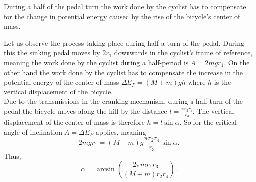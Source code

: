 {\ifEngHint
During a half of the pedal turn the work done by the cyclist has to compensate for the change in potential energy caused by the rise of the bicycle’s center of mass.
\fi


\ifEngSolution
Let us observe the process taking place during half a turn of the pedal. During this the sinking pedal moves by $2r_1$ downwards in the cyclist’s frame of reference, meaning the work done by the cyclist during a half-period is $A = 2mgr_1$. On the other hand the work done by the cyclist has to compensate the increase in the potential energy of the center of mass $\Delta E_P = (M + m)gh$ where $h$ is the vertical displacement of the bicycle.\\
Due to the transmissions in the cranking mechanism, during a half turn of the pedal the bicycle moves along the hill by the distance $l=\frac{\pi r_2 r_4}{r_3}$. The vertical displacement of the center of mass is therefore $h = l\sin\alpha$. So for the critical angle of inclination $A = \Delta E_P$ applies, meaning 
\[
2mgr_1 = (M + m)g\frac{\pi r_2r_4}{r_3}\sin\alpha.
\]
Thus, 
\[
\alpha = \arcsin\left(\frac{2\pi mr_1r_3}{(M + m)r_2r_4}\right).
\]
\fi
}